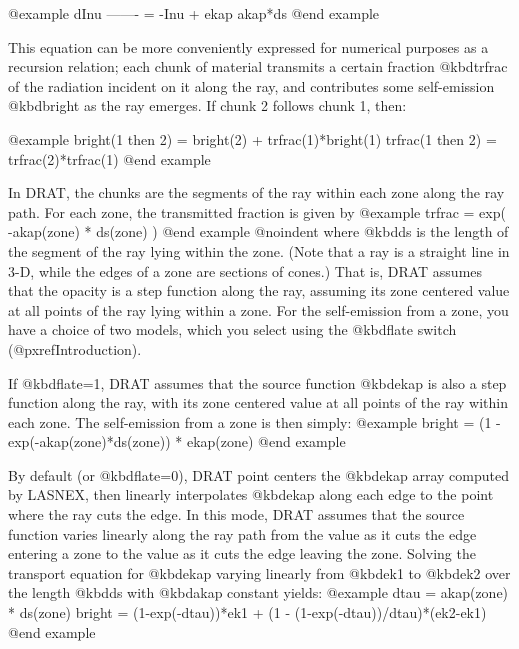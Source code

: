 @example
 dInu
------- = -Inu + ekap
akap*ds
@end example

This equation can be more conveniently expressed for numerical purposes
as a recursion relation; each chunk of material transmits a certain
fraction @kbd{trfrac} of the radiation incident on it along the ray,
and contributes some self-emission @kbd{bright} as the ray emerges. If
chunk 2 follows chunk 1, then:

@example
bright(1 then 2) = bright(2) + trfrac(1)*bright(1)
trfrac(1 then 2) = trfrac(2)*trfrac(1)
@end example

In DRAT, the chunks are the segments of the ray within each zone along
the ray path.  For each zone, the transmitted fraction is given by
@example
trfrac = exp( -akap(zone) * ds(zone) )
@end example
@noindent
where @kbd{ds} is the length of the segment of the ray lying within the
zone.  (Note that a ray is a straight line in 3-D, while the edges of a
zone are sections of cones.)  That is, DRAT assumes that the opacity is
a step function along the ray, assuming its zone centered value at all
points of the ray lying within a zone.  For the self-emission from a
zone, you have a choice of two models, which you select using the
@kbd{flate} switch (@pxref{Introduction}).

If @kbd{flate=1}, DRAT assumes that the source function @kbd{ekap} is
also a step function along the ray, with its zone centered value at all
points of the ray within each zone.  The self-emission from a zone is
then simply:
@example
bright = (1 - exp(-akap(zone)*ds(zone)) * ekap(zone)
@end example

By default (or @kbd{flate=0}), DRAT point centers the @kbd{ekap} array
computed by LASNEX, then linearly interpolates @kbd{ekap} along each
edge to the point where the ray cuts the edge.  In this mode, DRAT
assumes that the source function varies linearly along the ray path from
the value as it cuts the edge entering a zone to the value as it cuts
the edge leaving the zone.  Solving the transport equation for
@kbd{ekap} varying linearly from @kbd{ek1} to @kbd{ek2} over the length
@kbd{ds} with @kbd{akap} constant yields:
@example
dtau = akap(zone) * ds(zone)
bright = (1-exp(-dtau))*ek1 + (1 - (1-exp(-dtau))/dtau)*(ek2-ek1)
@end example

